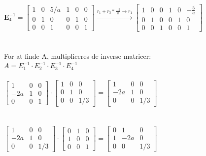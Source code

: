 \documentclass{article}
\begin{document}
$\mathbf{E}_4^{-1} = \left[\begin{array}{lll|lll}1 & 0 & 5 / a & 1 & 0 & 0 \\ 0 & 1 & 0 & 0 & 1 & 0 \\ 0 & 0 & 1 & 0 & 0 & 1\end{array}\right] \stackrel{r_1+r_3*\frac{-5}{a} \rightarrow r_1}{\longrightarrow} \left[\begin{array}{ccc|ccc}1 & 0 & 0 & 1 & 0 & -\frac{5}{a} \\ 0 & 1 & 0 & 0 & 1 & 0 \\ 0 & 0 & 1 & 0 & 0 & 1\end{array}\right]$
\\
\\
\\
For at finde A, multipliceres de inverse matricer:
\\
$A=E_1^{-1} \cdot E_2^{-1} \cdot E_3^{-1} \cdot E_4^{-1}$
\\
\\
$\left[\begin{array}{ccc}1 & 0 & 0 \\ -2 a & 1 & 0 \\ 0 & 0 & 1\end{array}\right] \cdot\left[\begin{array}{lll}1 & 0 & 0 \\ 0 & 1 & 0 \\ 0 & 0 & 1 / 3\end{array}\right]=\left[\begin{array}{ccc}1 & 0 & 0 \\ -2 a & 1 & 0 \\ 0 & 0 & 1 / 3\end{array}\right]$
\\
\\
\\
$\left[\begin{array}{ccc}1 & 0 & 0 \\ -2 a & 1 & 0 \\ 0 & 0 & 1 / 3\end{array}\right] \cdot\left[\begin{array}{ccc}0 & 1 & 0 \\ 1 & 0 & 0 \\ 0 & 0 & 1\end{array}\right]=\left[\begin{array}{ccc}0 & 1 & 0 \\ 1 & -2 a & 0 \\ 0 & 0 & 1 / 3\end{array}\right]$
\end{document}
